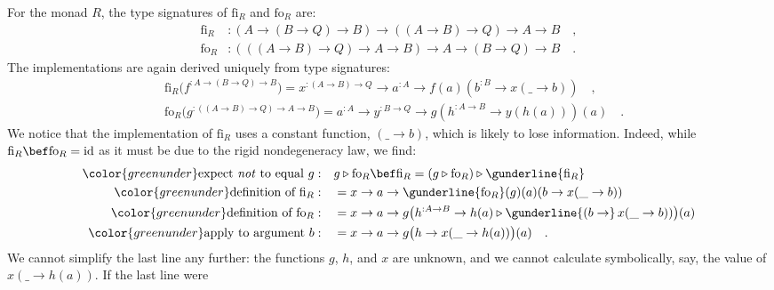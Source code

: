 For the monad $R$, the type signatures of $\text{fi}_{R}$ and $\text{fo}_{R}$
are:
\begin{align*}
\text{fi}_{R} & :\left(A\rightarrow\left(B\rightarrow Q\right)\rightarrow B\right)\rightarrow\left(\left(A\rightarrow B\right)\rightarrow Q\right)\rightarrow A\rightarrow B\quad,\\
\text{fo}_{R} & :\left(\left(\left(A\rightarrow B\right)\rightarrow Q\right)\rightarrow A\rightarrow B\right)\rightarrow A\rightarrow\left(B\rightarrow Q\right)\rightarrow B\quad.
\end{align*}
The implementations are again derived uniquely from type signatures:
\begin{align*}
 & \text{fi}_{R}\big(f^{:A\rightarrow\left(B\rightarrow Q\right)\rightarrow B}\big)=x^{:\left(A\rightarrow B\right)\rightarrow Q}\rightarrow a^{:A}\rightarrow f(a)(b^{:B}\rightarrow x(\_\rightarrow b))\quad,\\
 & \text{fo}_{R}\big(g^{:\left(\left(A\rightarrow B\right)\rightarrow Q\right)\rightarrow A\rightarrow B}\big)=a^{:A}\rightarrow y^{:B\rightarrow Q}\rightarrow g(h^{:A\rightarrow B}\rightarrow y(h(a)))(a)\quad.
\end{align*}
We notice that the implementation of $\text{fi}_{R}$ uses a constant
function, $\left(\_\rightarrow b\right)$, which is likely to lose
information. Indeed, while $\text{fi}_{R}\bef\text{fo}_{R}=\text{id}$
as it must be due to the rigid nondegeneracy law, we find:
\begin{align*}
{\color{greenunder}\text{expect \emph{not} to equal }g:}\quad & g\triangleright\text{fo}_{R}\bef\text{fi}_{R}=\left(g\triangleright\text{fo}_{R}\right)\triangleright\gunderline{\text{fi}_{R}}\\
{\color{greenunder}\text{definition of }\text{fi}_{R}:}\quad & =x\rightarrow a\rightarrow\gunderline{\text{fo}_{R}}(g)(a)(b\rightarrow x(\_\rightarrow b))\\
{\color{greenunder}\text{definition of }\text{fo}_{R}:}\quad & =x\rightarrow a\rightarrow g\big(h^{:A\rightarrow B}\rightarrow h(a)\triangleright\gunderline{(b\rightarrow}\,x(\_\rightarrow b))\big)(a)\\
{\color{greenunder}\text{apply to argument }b:}\quad & =x\rightarrow a\rightarrow g\big(h\rightarrow x(\_\rightarrow h(a))\big)(a)\quad.
\end{align*}
We cannot simplify the last line any further: the functions $g$,
$h$, and $x$ are unknown, and we cannot calculate symbolically,
say, the value of $x(\_\rightarrow h(a))$. If the last line were

